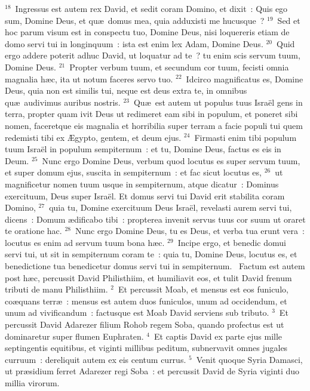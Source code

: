 ${}^{18}$~Ingressus est autem rex David, et sedit coram Domino, et dixit~: Quis ego sum, Domine Deus, et qu\ae\ domus mea, quia adduxisti me hucusque~?
${}^{19}$~Sed et hoc parum visum est in conspectu tuo, Domine Deus, nisi loquereris etiam de domo servi tui in longinquum~: ista est enim lex Adam, Domine Deus.
${}^{20}$~Quid ergo addere poterit adhuc David, ut loquatur ad te~? tu enim scis servum tuum, Domine Deus.
${}^{21}$~Propter verbum tuum, et secundum cor tuum, fecisti omnia magnalia h\ae c, ita ut notum faceres servo tuo.
${}^{22}$~Idcirco magnificatus es, Domine Deus, quia non est similis tui, neque est deus extra te, in omnibus qu\ae\ audivimus auribus nostris.
${}^{23}$~Qu\ae\ est autem ut populus tuus Isra\"el gens in terra, propter quam ivit Deus ut redimeret eam sibi in populum, et poneret sibi nomen, faceretque eis magnalia et horribilia super terram a facie populi tui quem redemisti tibi ex \AE gypto, gentem, et deum ejus.
${}^{24}$~Firmasti enim tibi populum tuum Isra\"el in populum sempiternum~: et tu, Domine Deus, factus es eis in Deum.
${}^{25}$~Nunc ergo Domine Deus, verbum quod locutus es super servum tuum, et super domum ejus, suscita in sempiternum~: et fac sicut locutus es,
${}^{26}$~ut magnificetur nomen tuum usque in sempiternum, atque dicatur~: Dominus exercituum, Deus super Isra\"el. Et domus servi tui David erit stabilita coram Domino,
${}^{27}$~quia tu, Domine exercituum Deus Isra\"el, revelasti aurem servi tui, dicens~: Domum \ae dificabo tibi~: propterea invenit servus tuus cor suum ut oraret te oratione hac.
${}^{28}$~Nunc ergo Domine Deus, tu es Deus, et verba tua erunt vera~: locutus es enim ad servum tuum bona h\ae c.
${}^{29}$~Incipe ergo, et benedic domui servi tui, ut sit in sempiternum coram te~: quia tu, Domine Deus, locutus es, et benedictione tua benedicetur domus servi tui in sempiternum.
~Factum est autem post h\ae c, percussit David Philisthiim, et humiliavit eos, et tulit David frenum tributi de manu Philisthiim.
${}^{2}$~Et percussit Moab, et mensus est eos funiculo, co\ae quans terr\ae~: mensus est autem duos funiculos, unum ad occidendum, et unum ad vivificandum~: factusque est Moab David serviens sub tributo.
${}^{3}$~Et percussit David Adarezer filium Rohob regem Soba, quando profectus est ut dominaretur super flumen Euphraten.
${}^{4}$~Et captis David ex parte ejus mille septingentis equitibus, et viginti millibus peditum, subnervavit omnes jugales curruum~: dereliquit autem ex eis centum currus.
${}^{5}$~Venit quoque Syria Damasci, ut pr\ae sidium ferret Adarezer regi Soba~: et percussit David de Syria viginti duo millia virorum.
